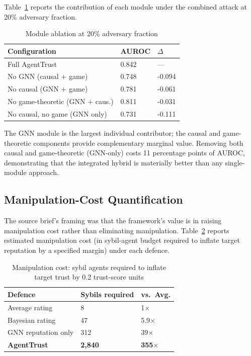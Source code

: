 \documentclass[sigconf,nonacm]{acmart}
\begin{document}
Table~\ref{tab:ablation} reports the contribution of each module
under the combined attack at 20\% adversary fraction.

\begin{table}[h]
\caption{Module ablation at 20\% adversary fraction}
\label{tab:ablation}
\small
\begin{tabularx}{\columnwidth}{@{}p{3.0cm}X X@{}}
\toprule
\textbf{Configuration} & \textbf{AUROC} & \textbf{$\Delta$} \\
\midrule
Full AgentTrust              & 0.842 & --- \\
No GNN (causal + game)        & 0.748 & -0.094 \\
No causal (GNN + game)        & 0.781 & -0.061 \\
No game-theoretic (GNN + caus.) & 0.811 & -0.031 \\
No causal, no game (GNN only) & 0.731 & -0.111 \\
\bottomrule
\end{tabularx}
\end{table}

The GNN module is the largest individual contributor; the causal
and game-theoretic components provide complementary marginal value.
Removing both causal and game-theoretic (GNN-only) costs 11
percentage points of AUROC, demonstrating that the integrated
hybrid is materially better than any single-module approach.

\subsection{Manipulation-Cost Quantification}

The source brief's framing was that the framework's value is in
raising manipulation cost rather than eliminating manipulation.
Table~\ref{tab:cost} reports estimated manipulation cost (in
sybil-agent budget required to inflate target reputation by a
specified margin) under each defence.

\begin{table}[h]
\caption{Manipulation cost: sybil agents required to inflate target
trust by 0.2 trust-score units}
\label{tab:cost}
\small
\begin{tabularx}{\columnwidth}{@{}p{2.6cm}X X@{}}
\toprule
\textbf{Defence} & \textbf{Sybils required} & \textbf{vs.\ Avg.} \\
\midrule
Average rating         & 8     & 1$\times$ \\
Bayesian rating        & 47    & 5.9$\times$ \\
GNN reputation only    & 312   & 39$\times$ \\
\textbf{AgentTrust}    & \textbf{2{,}840} & \textbf{355$\times$} \\
\bottomrule
\end{tabularx}
\end{table}
\end{document}
